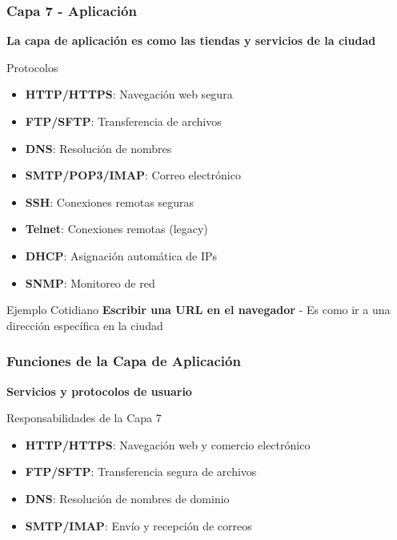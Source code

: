 \documentclass[aspectratio=169]{beamer}
\begin{document}
            \begin{frame}
              \frametitle{Capa 7 - Aplicación}
              
              \begin{center}
              \Large \textbf{La capa de aplicación es como las tiendas y servicios de la ciudad}
              \end{center}
              \begin{block}{Protocolos}
              \begin{itemize}
              \item \textbf{HTTP/HTTPS}: Navegación web segura
              \item \textbf{FTP/SFTP}: Transferencia de archivos
              \item \textbf{DNS}: Resolución de nombres
              \item \textbf{SMTP/POP3/IMAP}: Correo electrónico
              \item \textbf{SSH}: Conexiones remotas seguras
              \item \textbf{Telnet}: Conexiones remotas (legacy)
              \item \textbf{DHCP}: Asignación automática de IPs
              \item \textbf{SNMP}: Monitoreo de red
              \end{itemize}
              \end{block}
              
              \begin{block}{Ejemplo Cotidiano}
              \textbf{Escribir una URL en el navegador} - Es como ir a una dirección específica en la ciudad
              \end{block}
              \end{frame}
            
            \begin{frame}
            \frametitle{Funciones de la Capa de Aplicación}
            
            \begin{center}
            \Large \textbf{Servicios y protocolos de usuario}
            \end{center}
        
            \begin{block}{Responsabilidades de la Capa 7}
            \begin{itemize}
            \item \textbf{HTTP/HTTPS}: Navegación web y comercio electrónico
            \item \textbf{FTP/SFTP}: Transferencia segura de archivos
            \item \textbf{DNS}: Resolución de nombres de dominio
            \item \textbf{SMTP/IMAP}: Envío y recepción de correos
            \end{itemize}
            \end{block}
            \end{frame}
\end{document}
